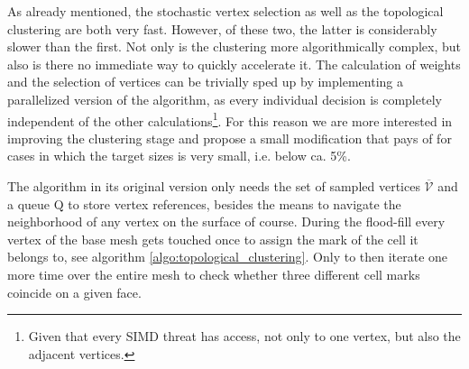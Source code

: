 As already mentioned, the stochastic vertex selection as well as the topological clustering are both very fast.
However, of these two, the latter is considerably slower than the first.
Not only is the clustering more algorithmically complex, but also is there no immediate way to quickly accelerate it.
The calculation of weights and the selection of vertices can be trivially sped up by implementing a parallelized version of the algorithm, as every individual decision is completely independent of the other calculations\footnote{ Given that every SIMD threat has access, not only to one vertex, but also the adjacent vertices.}.
For this reason we are more interested in improving the clustering stage and propose a small modification that pays of for cases in which the target sizes is very small, i.e. below ca. 5\%.

The algorithm in its original version only needs the set of sampled vertices $\overline{\mathcal{V}}$ and a queue $\mathrm{Q}$ to store vertex references, besides the means to navigate the neighborhood of any vertex on the surface of course.
During the flood-fill every vertex of the base mesh gets touched once to assign the mark of the cell it belongs to, see algorithm \ref{algo:topological_clustering}.
Only to then iterate one more time over the entire mesh to check whether three different cell marks coincide on a given face.

